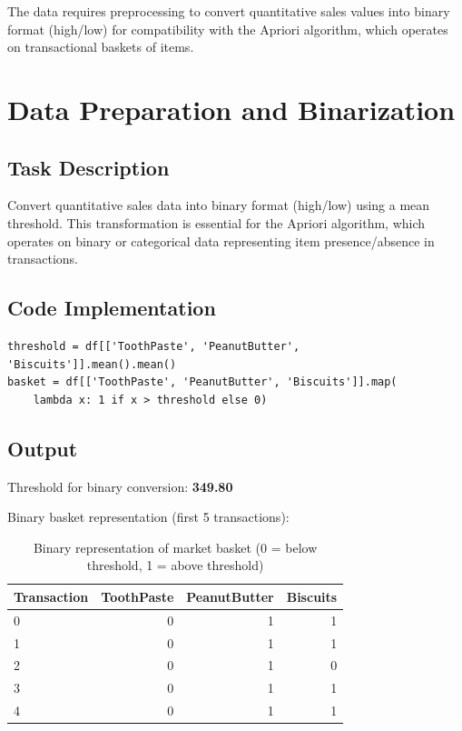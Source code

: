\documentclass[12pt,a4paper]{article}
\begin{document}
The data requires preprocessing to convert quantitative sales values into binary format (high/low) for compatibility with the Apriori algorithm, which operates on transactional baskets of items.


\section{Data Preparation and Binarization}

\subsection{Task Description}
Convert quantitative sales data into binary format (high/low) using a mean threshold. This transformation is essential for the Apriori algorithm, which operates on binary or categorical data representing item presence/absence in transactions.

\subsection{Code Implementation}

\begin{lstlisting}
threshold = df[['ToothPaste', 'PeanutButter', 'Biscuits']].mean().mean()
basket = df[['ToothPaste', 'PeanutButter', 'Biscuits']].map(
    lambda x: 1 if x > threshold else 0)
\end{lstlisting}

\subsection{Output}
Threshold for binary conversion: \textbf{349.80}

Binary basket representation (first 5 transactions):
\begin{table}[H]
\centering
\small
\begin{tabular}{l|r|r|r}
\toprule
\textbf{Transaction} & \textbf{ToothPaste} & \textbf{PeanutButter} & \textbf{Biscuits} \\
\midrule
0 & 0 & 1 & 1 \\
1 & 0 & 1 & 1 \\
2 & 0 & 1 & 0 \\
3 & 0 & 1 & 1 \\
4 & 0 & 1 & 1 \\
\bottomrule
\end{tabular}
\caption{Binary representation of market basket (0 = below threshold, 1 = above threshold)}
\end{table}
\end{document}
